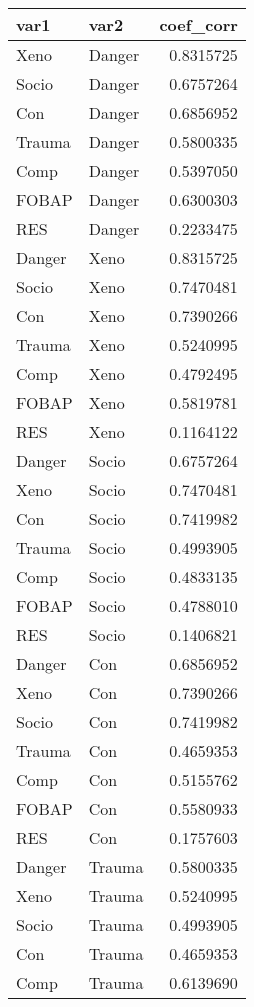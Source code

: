 \documentclass[
]{book}
\begin{document}
\begin{table}[H]
\centering
\begin{tabular}[t]{l|l|r}
\hline
var1 & var2 & coef\_corr\\
\hline
Xeno & Danger & 0.8315725\\
\hline
Socio & Danger & 0.6757264\\
\hline
Con & Danger & 0.6856952\\
\hline
Trauma & Danger & 0.5800335\\
\hline
Comp & Danger & 0.5397050\\
\hline
FOBAP & Danger & 0.6300303\\
\hline
RES & Danger & 0.2233475\\
\hline
Danger & Xeno & 0.8315725\\
\hline
Socio & Xeno & 0.7470481\\
\hline
Con & Xeno & 0.7390266\\
\hline
Trauma & Xeno & 0.5240995\\
\hline
Comp & Xeno & 0.4792495\\
\hline
FOBAP & Xeno & 0.5819781\\
\hline
RES & Xeno & 0.1164122\\
\hline
Danger & Socio & 0.6757264\\
\hline
Xeno & Socio & 0.7470481\\
\hline
Con & Socio & 0.7419982\\
\hline
Trauma & Socio & 0.4993905\\
\hline
Comp & Socio & 0.4833135\\
\hline
FOBAP & Socio & 0.4788010\\
\hline
RES & Socio & 0.1406821\\
\hline
Danger & Con & 0.6856952\\
\hline
Xeno & Con & 0.7390266\\
\hline
Socio & Con & 0.7419982\\
\hline
Trauma & Con & 0.4659353\\
\hline
Comp & Con & 0.5155762\\
\hline
FOBAP & Con & 0.5580933\\
\hline
RES & Con & 0.1757603\\
\hline
Danger & Trauma & 0.5800335\\
\hline
Xeno & Trauma & 0.5240995\\
\hline
Socio & Trauma & 0.4993905\\
\hline
Con & Trauma & 0.4659353\\
\hline
Comp & Trauma & 0.6139690\\

\end{tabular}
\end{table}
\end{document}

